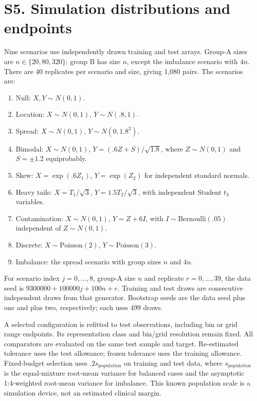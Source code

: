 \documentclass[10pt]{article}
\begin{document}
\section*{S5. Simulation distributions and endpoints}
Nine scenarios use independently drawn training and test arrays. Group-A sizes are $n\in\{20,80,320\}$; group B has size $n$, except the imbalance scenario with $4n$. There are 40 replicates per scenario and size, giving 1,080 pairs. The scenarios are:
\begin{enumerate}
\item Null: $X,Y\sim N(0,1)$.
\item Location: $X\sim N(0,1)$, $Y\sim N(.8,1)$.
\item Spread: $X\sim N(0,1)$, $Y\sim N(0,1.8^2)$.
\item Bimodal: $X\sim N(0,1)$, $Y=(.6Z+S)/\sqrt{1.8}$, where $Z\sim N(0,1)$ and $S=\pm1.2$ equiprobably.
\item Skew: $X=\exp(.6Z_1)$, $Y=\exp(Z_2)$ for independent standard normals.
\item Heavy tails: $X=T_1/\sqrt3$, $Y=1.5T_2/\sqrt3$, with independent Student $t_3$ variables.
\item Contamination: $X\sim N(0,1)$, $Y=Z+6I$, with $I\sim\mathrm{Bernoulli}(.05)$ independent of $Z\sim N(0,1)$.
\item Discrete: $X\sim\mathrm{Poisson}(2)$, $Y\sim\mathrm{Poisson}(3)$.
\item Imbalance: the spread scenario with group sizes $n$ and $4n$.
\end{enumerate}
For scenario index $j=0,\ldots,8$, group-A size $n$ and replicate $r=0,\ldots,39$, the data seed is $9300000+100000j+100n+r$. Training and test draws are consecutive independent draws from that generator. Bootstrap seeds are the data seed plus one and plus two, respectively; each uses 499 draws.

A selected configuration is refitted to test observations, including bin or grid range endpoints. Its representation class and bin/grid resolution remain fixed. All comparators are evaluated on the same test sample and target. Re-estimated tolerance uses the test allowance; frozen tolerance uses the training allowance. Fixed-budget selection uses $.2s_{\mathrm{population}}$ on training and test data, where $s_{\mathrm{population}}$ is the equal-mixture root-mean variance for balanced cases and the asymptotic 1:4-weighted root-mean variance for imbalance. This known population scale is a simulation device, not an estimated clinical margin.
\end{document}
